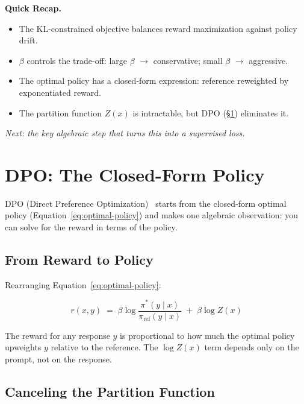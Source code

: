 \begin{quickrecap}
\textbf{Quick Recap.}
\begin{itemize}[nosep,leftmargin=1.5em]
  \item The KL-constrained objective balances reward maximization against policy drift.
  \item $\beta$ controls the trade-off: large $\beta$ $\to$ conservative; small $\beta$ $\to$ aggressive.
  \item The optimal policy has a closed-form expression: reference reweighted by exponentiated reward.
  \item The partition function $Z(x)$ is intractable, but DPO (\S\ref{sec:dpo-derivation}) eliminates it.
\end{itemize}
\textit{Next: the key algebraic step that turns this into a supervised loss.}
\end{quickrecap}


\section{DPO: The Closed-Form Policy}
\label{sec:dpo-derivation}

DPO (Direct Preference Optimization)~\cite{rafailov2023dpo} starts from the closed-form optimal policy (Equation~\ref{eq:optimal-policy}) and makes one algebraic observation: you can solve for the reward in terms of the policy.

\subsection{From Reward to Policy}

Rearranging Equation~\ref{eq:optimal-policy}:

\begin{equation}
\label{eq:reward-from-policy}
r(x, y) \;=\; \beta \log \frac{\pi^*(y \mid x)}{\pi_{\text{ref}}(y \mid x)} \;+\; \beta \log Z(x)
\end{equation}

The reward for any response $y$ is proportional to how much the optimal policy upweights $y$ relative to the reference. The $\log Z(x)$ term depends only on the prompt, not on the response.

\subsection{Canceling the Partition Function}

